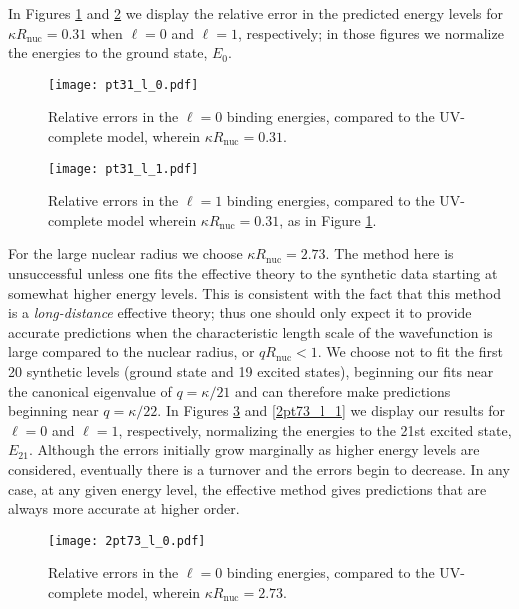 \documentclass[pra,twocolumn,nofootinbib, superscriptaddress]{revtex4}%
\def\k{\kappa}
\begin{document}
In Figures \ref{pt31_l_0} and \ref{pt31_l_1} we display the relative error in the predicted energy levels for $\k R_\text{nuc}=0.31$ when $\ell=0$ and $\ell=1$, respectively; in those figures we normalize the energies to the ground state, $E_0$.

\begin{figure}[htp]
  \begin{center}
    \texttt{[image: pt31\_l\_0.pdf]}
  \end{center}
  \caption{Relative errors in the $\ell=0$ binding energies, compared to the UV-complete model, wherein $\k R_\text{nuc}=0.31$. }
  \label{pt31_l_0}
  \end{figure}

\begin{figure}[htp]
  \begin{center}
    \texttt{[image: pt31\_l\_1.pdf]}
  \end{center}
  \caption{Relative errors in the $\ell=1$ binding energies, compared to the UV-complete model wherein $\k R_\text{nuc}=0.31$, as in Figure \ref{pt31_l_0}.}
  \label{pt31_l_1}
  \end{figure}




 For the large nuclear radius we choose $\k R_\text{nuc}=2.73$. The method here is unsuccessful unless one fits the effective theory to the synthetic data starting at somewhat higher energy levels. This is consistent with the fact that this method is a \emph{long-distance} effective theory; thus one should only expect it to provide accurate predictions when the characteristic length scale of the wavefunction is large compared to the nuclear radius, or $q R_\text{nuc}<1$. We choose not to fit the first 20 synthetic levels (ground state and 19 excited states), beginning our fits near the canonical eigenvalue of $q=\k/21$ and can therefore make predictions beginning near $q=\k/22$. In Figures \ref{2pt73_l_0} and \ref{2pt73_l_1} we display our results for $\ell=0$ and $\ell=1$, respectively, normalizing the energies to the 21st excited state, $E_{21}$. Although the errors initially grow marginally as higher energy levels are considered, eventually there is a turnover and the errors begin to decrease. In any case, at any given energy level,  the effective method gives predictions that are always more accurate at higher order.


\begin{figure}[htp]
  \begin{center}
    \texttt{[image: 2pt73\_l\_0.pdf]}
  \end{center}
  \caption{Relative errors in the $\ell=0$ binding energies, compared to the UV-complete model, wherein $\k R_\text{nuc}=2.73$.}
  \label{2pt73_l_0}
  \end{figure}
\end{document}
